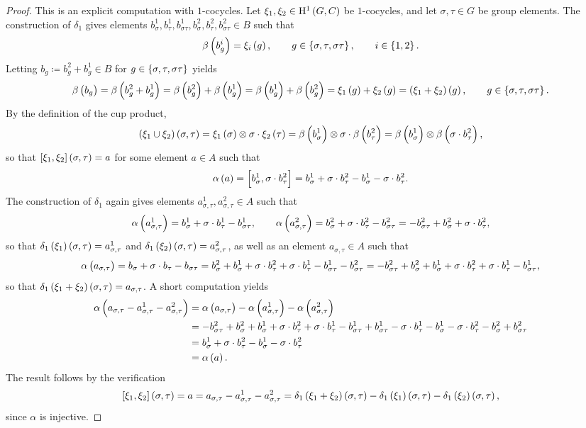 \begin{proof}
This is an explicit computation with $ 1 $-cocycles. Let $ \xi_1, \xi_2 \in \H^1\br{G, C} $ be $ 1 $-cocycles, and let $ \sigma, \tau \in G $ be group elements. The construction of $ \delta_1 $ gives elements $ b_\sigma^1, b_\tau^1, b_{\sigma\tau}^1, b_\sigma^2, b_\tau^2, b_{\sigma\tau}^2 \in B $ such that
$$ \beta\br{b_g^i} = \xi_i\br{g}, \qquad g \in \cbr{\sigma, \tau, \sigma\tau}, \qquad i \in \cbr{1, 2}. $$
Letting $ b_g \coloneqq b_g^2 + b_g^1 \in B $ for $ g \in \cbr{\sigma, \tau, \sigma\tau} $ yields
$$ \beta\br{b_g} = \beta\br{b_g^2 + b_g^1} = \beta\br{b_g^2} + \beta\br{b_g^1} = \beta\br{b_g^1} + \beta\br{b_g^2} = \xi_1\br{g} + \xi_2\br{g} = \br{\xi_1 + \xi_2}\br{g}, \qquad g \in \cbr{\sigma, \tau, \sigma\tau}. $$
By the definition of the cup product,
$$ \br{\xi_1 \cup \xi_2}\br{\sigma, \tau} = \xi_1\br{\sigma} \otimes \sigma \cdot \xi_2\br{\tau} = \beta\br{b_\sigma^1} \otimes \sigma \cdot \beta\br{b_\tau^2} = \beta\br{b_\sigma^1} \otimes \beta\br{\sigma \cdot b_\tau^2}, $$
so that $ \sbr{\xi_1, \xi_2}\br{\sigma, \tau} = a $ for some element $ a \in A $ such that
$$ \alpha\br{a} = \sbr{b_\sigma^1, \sigma \cdot b_\tau^2} = b_\sigma^1 + \sigma \cdot b_\tau^2 - b_\sigma^1 - \sigma \cdot b_\tau^2. $$
The construction of $ \delta_1 $ again gives elements $ a_{\sigma, \tau}^1, a_{\sigma, \tau}^2 \in A $ such that
$$ \alpha\br{a_{\sigma, \tau}^1} = b_\sigma^1 + \sigma \cdot b_\tau^1 - b_{\sigma\tau}^1, \qquad \alpha\br{a_{\sigma, \tau}^2} = b_\sigma^2 + \sigma \cdot b_\tau^2 - b_{\sigma\tau}^2 = -b_{\sigma\tau}^2 + b_\sigma^2 + \sigma \cdot b_\tau^2, $$
so that $ \delta_1\br{\xi_1}\br{\sigma, \tau} = a_{\sigma, \tau}^1 $ and $ \delta_1\br{\xi_2}\br{\sigma, \tau} = a_{\sigma, \tau}^2 $, as well as an element $ a_{\sigma, \tau} \in A $ such that
$$ \alpha\br{a_{\sigma, \tau}} = b_\sigma + \sigma \cdot b_\tau - b_{\sigma\tau} = b_\sigma^2 + b_\sigma^1 + \sigma \cdot b_\tau^2 + \sigma \cdot b_\tau^1 - b_{\sigma\tau}^1 - b_{\sigma\tau}^2 = -b_{\sigma\tau}^2 + b_\sigma^2 + b_\sigma^1 + \sigma \cdot b_\tau^2 + \sigma \cdot b_\tau^1 - b_{\sigma\tau}^1, $$
so that $ \delta_1\br{\xi_1 + \xi_2}\br{\sigma, \tau} = a_{\sigma, \tau} $. A short computation yields
\begin{align*}
\alpha\br{a_{\sigma, \tau} - a_{\sigma, \tau}^1 - a_{\sigma, \tau}^2}
& = \alpha\br{a_{\sigma, \tau}} - \alpha\br{a_{\sigma, \tau}^1} - \alpha\br{a_{\sigma, \tau}^2} \\
& = -b_{\sigma\tau}^2 + b_\sigma^2 + b_\sigma^1 + \sigma \cdot b_\tau^2 + \sigma \cdot b_\tau^1 - b_{\sigma\tau}^1 + b_{\sigma\tau}^1 - \sigma \cdot b_\tau^1 - b_\sigma^1 - \sigma \cdot b_\tau^2 - b_\sigma^2 + b_{\sigma\tau}^2 \\
& = b_\sigma^1 + \sigma \cdot b_\tau^2 - b_\sigma^1 - \sigma \cdot b_\tau^2 \\
& = \alpha\br{a}.
\end{align*}
The result follows by the verification
$$ \sbr{\xi_1, \xi_2}\br{\sigma, \tau} = a = a_{\sigma, \tau} - a_{\sigma, \tau}^1 - a_{\sigma, \tau}^2 = \delta_1\br{\xi_1 + \xi_2}\br{\sigma, \tau} - \delta_1\br{\xi_1}\br{\sigma, \tau} - \delta_1\br{\xi_2}\br{\sigma, \tau}, $$
since $ \alpha $ is injective.
\end{proof}

